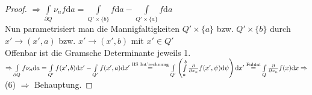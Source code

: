 \begin{proof}
$\Rightarrow \int\limits_{\partial Q} \nu_n f \mathrm{d}a =
\int\limits_{Q' \times \lbrace b \rbrace} f \mathrm{d}a -
\int\limits_{Q' \times \lbrace a \rbrace} f \mathrm{d}a
$ \\
Nun parametrisiert man die Mannigfaltigkeiten 
$Q' \times \lbrace a \rbrace $ bzw. $ Q' \times \lbrace b \rbrace $ durch \\
$x' \rightarrow (x', a) $ bzw. $x' \rightarrow (x', b) $ mit $x' \in Q' $ \\
Offenbar ist die Gramsche Determinante jeweils 1. \\
$\Rightarrow 
\int\limits_{\partial Q} f \nu_n \mathrm{d}a =
\int\limits_{Q'} f(x',b) \mathrm{d}x' -
\int\limits_{Q'} f(x',a) \mathrm{d}x' \\
\stackrel{\text{HS Int'rechnung}}{=}
\int\limits_{Q'} \left(
\int\limits_a^b \frac{\partial{}}{\partial{x_n}} f(x', \psi) \mathrm{d}\psi \right) \mathrm{d}x' \\
\stackrel{\text{Fubini}}{=} \int\limits_Q \frac{\partial{}}{\partial{x_n}} f(x) \mathrm{d}x
\Rightarrow $ (6) $\Rightarrow $ Behauptung.
\end{proof}